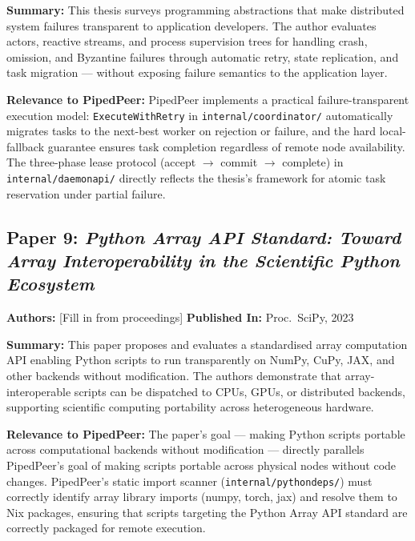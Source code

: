 \noindent\textbf{Summary:}
This thesis surveys programming abstractions that make distributed system failures
transparent to application developers. The author evaluates actors, reactive streams,
and process supervision trees for handling crash, omission, and Byzantine failures
through automatic retry, state replication, and task migration — without exposing
failure semantics to the application layer.

\noindent\textbf{Relevance to PipedPeer:}
PipedPeer implements a practical failure-transparent execution model:
\texttt{ExecuteWithRetry} in \texttt{internal/coordinator/} automatically migrates
tasks to the next-best worker on rejection or failure, and the hard local-fallback
guarantee ensures task completion regardless of remote node availability. The
three-phase lease protocol (accept $\to$ commit $\to$ complete) in
\texttt{internal/daemonapi/} directly reflects the thesis's framework for atomic
task reservation under partial failure.

\subsection*{Paper 9: \textit{Python Array API Standard: Toward Array
Interoperability in the Scientific Python Ecosystem}}
\textbf{Authors:} [Fill in from proceedings] \quad
\textbf{Published In:} Proc.\ SciPy, 2023~\cite{author2023python}

\noindent\textbf{Summary:}
This paper proposes and evaluates a standardised array computation API enabling
Python scripts to run transparently on NumPy, CuPy, JAX, and other backends without
modification. The authors demonstrate that array-interoperable scripts can be
dispatched to CPUs, GPUs, or distributed backends, supporting scientific computing
portability across heterogeneous hardware.

\noindent\textbf{Relevance to PipedPeer:}
The paper's goal — making Python scripts portable across computational backends
without modification — directly parallels PipedPeer's goal of making scripts
portable across physical nodes without code changes. PipedPeer's static import
scanner (\texttt{internal/pythondeps/}) must correctly identify array library
imports (numpy, torch, jax) and resolve them to Nix packages, ensuring that scripts
targeting the Python Array API standard are correctly packaged for remote execution.

